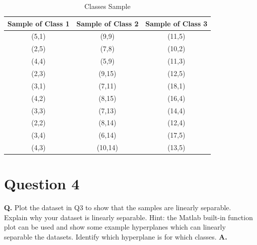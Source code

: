 \documentclass[12pt]{report}
\begin{document}
\begin{table}[H]
	\centering
	\begin{tabular}{|c | c | c|}
		\hline
		Sample of Class 1 & Sample of Class 2 & Sample of Class 3 \\ [0.5ex]
		\hline\hline
		(5,1)             & (9,9)             & (11,5)            \\
		\hline
		(2,5)             & (7,8)             & (10,2)            \\
		\hline
		(4,4)             & (5,9)             & (11,3)            \\
		\hline
		(2,3)             & (9,15)            & (12,5)            \\
		\hline
		(3,1)             & (7,11)            & (18,1)            \\
		\hline
		(4,2)             & (8,15)            & (16,4)            \\
		\hline
		(3,3)             & (7,13)            & (14,4)            \\
		\hline
		(2,2)             & (8,14)            & (12,4)            \\
		\hline
		(3,4)             & (6,14)            & (17,5)            \\
		\hline
		(4,3)             & (10,14)           & (13,5)            \\
		\hline
	\end{tabular}
	\caption{Classes Sample}
\end{table}

\section{Question 4}

\textbf{Q.} Plot the dataset in Q3 to show that the samples are linearly separable. Explain
why your dataset is linearly separable. Hint: the Matlab built-in function
plot can be used and show some example hyperplanes which can linearly separable
the datasets. Identify which hyperplane is for which classes.\newline\newline
\textbf{A.}
\end{document}
